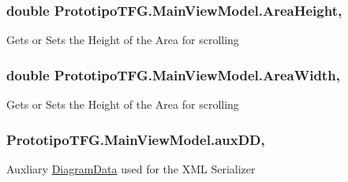 \subsubsection[{Area\+Height}]{\setlength{\rightskip}{0pt plus 5cm}double Prototipo\+T\+F\+G.\+Main\+View\+Model.\+Area\+Height\hspace{0.3cm}{\ttfamily [get]}, {\ttfamily [set]}}\label{class_prototipo_t_f_g_1_1_main_view_model_a0668d75bbef450ad264cedb36afa3f0a}


Gets or Sets the Height of the Area for scrolling 

\hypertarget{class_prototipo_t_f_g_1_1_main_view_model_a3f34ea0e7a598c5a5a3c8a3b180e3900}{}
\subsubsection[{Area\+Width}]{\setlength{\rightskip}{0pt plus 5cm}double Prototipo\+T\+F\+G.\+Main\+View\+Model.\+Area\+Width\hspace{0.3cm}{\ttfamily [get]}, {\ttfamily [set]}}\label{class_prototipo_t_f_g_1_1_main_view_model_a3f34ea0e7a598c5a5a3c8a3b180e3900}


Gets or Sets the Height of the Area for scrolling 

\hypertarget{class_prototipo_t_f_g_1_1_main_view_model_af16d48151e02d562bcb956b5910b3d56}{}
\subsubsection[{aux\+D\+D}]{ Prototipo\+T\+F\+G.\+Main\+View\+Model.\+aux\+D\+D\hspace{0.3cm}{\ttfamily [get]}, {\ttfamily [set]}}\label{class_prototipo_t_f_g_1_1_main_view_model_af16d48151e02d562bcb956b5910b3d56}


Auxliary \hyperlink{class_prototipo_t_f_g_1_1_diagram_data}{Diagram\+Data} used for the X\+M\+L Serializer 

\hypertarget{class_prototipo_t_f_g_1_1_main_view_model_a6aa57a570df94d6ba318e8d9a30bc96a}{}
